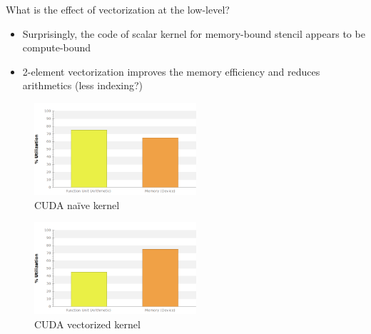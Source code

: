 \documentclass[aspectratio=169]{beamer}
\begin{document}
\begin{frame}[fragile]{What is the effect of vectorization at the low-level?}

\begin{itemize}
\item Surprisingly, the code of scalar kernel for memory-bound stencil appears to be compute-bound
\item 2-element vectorization improves the memory efficiency and reduces arithmetics (less indexing?)
\end{itemize}

\begin{center}
\begin{minipage}{6cm}
\begin{figure}
\includegraphics[width=6cm]{figures/cuda_utilization}
\caption{CUDA na\"{i}ve kernel}
\end{figure}
\end{minipage}%
\hskip1cm
\begin{minipage}{6cm}
\begin{figure}
\includegraphics[width=6cm]{figures/cuda_vec2_utilization}
\caption{CUDA vectorized kernel}
\end{figure}
\end{minipage}
\end{center}

\end{frame}
\end{document}
